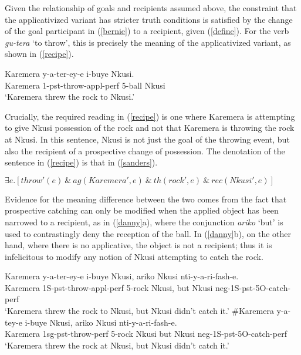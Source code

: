 \documentclass[output=paper]{langsci/langscibook}
\begin{document}
Given the relationship of {\sc goals} and {\sc recipients} assumed above, the constraint that the applicativized variant has stricter truth conditions is satisfied by the change of the {\sc goal} participant in (\ref{bernie}) to a {\sc recipient}, given (\ref{define}).  For the verb \emph{gu-tera} `to throw', this is precisely the meaning of the applicativized variant, as shown in (\ref{recipe}). 

\begin{exe}
	\ex\label{recipe}\gll Karemera y-a-ter-ey-e i-buye Nkusi.\\
					Karemera 1-{\sc pst-}throw-{\sc appl-perf}	5-ball Nkusi\\
					\glt `Karemera threw the rock to Nkusi.'
\end{exe}
%
 Crucially, the required reading in (\ref{recipe}) is one where Karemera is attempting to give Nkusi possession of the rock and not that Karemera is throwing the rock at Nkusi. In this sentence, Nkusi is not just the {\sc goal} of the throwing event, but also the {\sc recipient} of a prospective change of possession. The denotation of the sentence in (\ref{recipe}) is that in (\ref{sanders}).

\begin{exe}
\ex\label{sanders}  $\exists e.[throw'(e) \ \&\ ag(Karemera', e) \ \&\ th(rock', e) \ \&\ rec(Nkusi', e)]$ 
\end{exe}

Evidence for the meaning difference between the two comes from the fact that prospective catching can only be modified when the applied object has been narrowed to a {\sc recipient}, as in (\ref{danny}a), where the conjunction \emph{ariko} `but' is used to contrastingly deny the reception of the ball.  In (\ref{danny}b), on the other hand, where there is no applicative, the object is not a {\sc recipient}; thus it is infelicitous to modify any notion of Nkusi attempting to catch the rock. 

\begin{exe}
	\ex\label{danny}\begin{xlist}
	\iffalse
		\ex\gll Karemera y-a-tey-e i-buye Nkusi, ariko Karemera a-ra-mu-hush-a.\\
				Karemera {\sc 1S-pst}-throw-{\sc perf} 5-rock Nkusi, but Karemera {\sc 1S-pst-1O}-miss-{\sc imp}\\
				\glt `Karemera threw the rock at Nkusi, but Karemera missed.'
	\fi
		\ex\gll  Karemera y-a-ter-ey-e i-buye Nkusi, ariko Nkusi nti-y-a-ri-fash-e.\\
				Karemera 1S{\sc-pst-}throw-{\sc appl-perf} 5-rock Nkusi, but Nkusi {\sc neg-1S-pst-5O}-catch-{\sc perf}\\
		\glt `Karemera threw the rock to Nkusi, but Nkusi didn't catch it.'
	\ex\gll \#Karemera y-a-tey-e i-buye Nkusi, ariko Nkusi nti-y-a-ri-fash-e.\\
			Karemera {\sc 1sg-pst-}throw-{\sc perf} 5-rock Nkusi but Nkusi {\sc neg-1S-pst-5O}-catch-{\sc perf}\\	
		\glt `Karemera threw the rock at Nkusi, but Nkusi didn't catch it.'
\end{xlist}
\end{exe}
\end{document}
